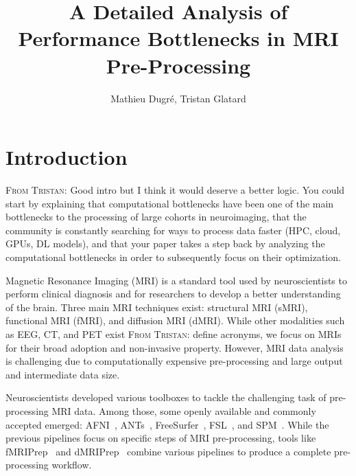 \documentclass[conference]{IEEEtran}
\title{A Detailed Analysis of Performance Bottlenecks in MRI Pre-Processing}
\author{Mathieu Dugr\'e, Tristan Glatard \TG{I think Yohan should be co-author given his technical input}}
\newcommand{\TG}[1]{\color{blue}\textsc{From Tristan: }#1\color{black}}
\begin{document}
\maketitle

\begin{abstract}
\end{abstract}

\section{Introduction}

\TG{Good intro but I think it would deserve a better logic. You could start by explaining that computational bottlenecks 
have been one of the main bottlenecks to the processing of large cohorts in neuroimaging, that the community is constantly searching for ways to process data faster (HPC, cloud, GPUs, DL models), and that your paper takes a step back by analyzing the computational bottlenecks in order to subsequently focus on their optimization. 
}

Magnetic Resonance Imaging (MRI) is a standard tool used by neuroscientists to perform clinical diagnosis and for researchers to develop a better understanding of the brain. Three main MRI techniques exist: structural MRI (sMRI), functional MRI (fMRI), and diffusion MRI (dMRI). While other modalities such as EEG, CT, and PET exist \TG{define acronyms}, we focus on MRIs for their broad adoption and non-invasive property. However, MRI data analysis is challenging due to computationally expensive pre-processing and large output and intermediate data size.

Neuroscientists developed various toolboxes to tackle the challenging task of pre-processing MRI data. Among those, some openly available and commonly accepted emerged: AFNI~\cite{Cox1996-sl}, ANTs~\cite{Avants_undated-fu}, FreeSurfer~\cite{Fischl2012-bp}, FSL~\cite{Jenkinson2012-cq}, and SPM~\cite{Friston2007-ag}. While the previous pipelines focus on specific steps of MRI pre-processing, tools like fMRIPrep~\cite{Esteban2019-og} and dMRIPrep~\cite{Michael2021-4515513} combine various pipelines to produce a complete pre-processing workflow.
\end{document}
